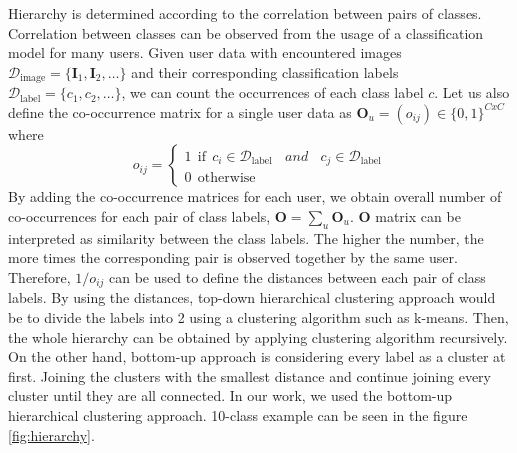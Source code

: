 Hierarchy is determined according to the correlation between pairs of classes. 
Correlation between classes can be observed from the usage of a classification model for many users.
Given user data with encountered images $\mathcal{D}_\mathrm{image} = \{\mathbf{I}_1,\mathbf{I}_2,\dots\}$ and their corresponding classification labels $\mathcal{D}_\mathrm{label} = \{c_1,c_2,\dots\}$, we can count the occurrences of each class label $c$.
Let us also define the co-occurrence matrix for a single user data as $\mathbf{O}_u = (o_{ij})\in\{0,1\}^{CxC}$ where
\begin{equation}
o_{ij} =
\begin{cases}
1~~\mathrm{if}~~c_i\in\mathcal{D}_\mathrm{label}~~~~and~~~~c_j\in\mathcal{D}_\mathrm{label}\\
0~~\mathrm{otherwise}
\end{cases}
\end{equation}
By adding the co-occurrence matrices for each user, we obtain overall number of co-occurrences for each pair of class labels, $\mathbf{O} = \sum_u \mathbf{O}_u$.
$\mathbf{O}$ matrix can be interpreted as similarity between the class labels. 
The higher the number, the more times the corresponding pair is observed together by the same user.
Therefore, $1/o_{ij}$ can be used to define the distances between each pair of class labels.
By using the distances, top-down hierarchical clustering approach would be to divide the labels into 2 using a clustering algorithm such as k-means. 
Then, the whole hierarchy can be obtained by applying clustering algorithm recursively.
On the other hand, bottom-up approach is considering every label as a cluster at first. 
Joining the clusters with the smallest distance and continue joining every cluster until they are all connected.
In our work, we used the bottom-up hierarchical clustering approach.
10-class example can be seen in the figure \ref{fig:hierarchy}.

